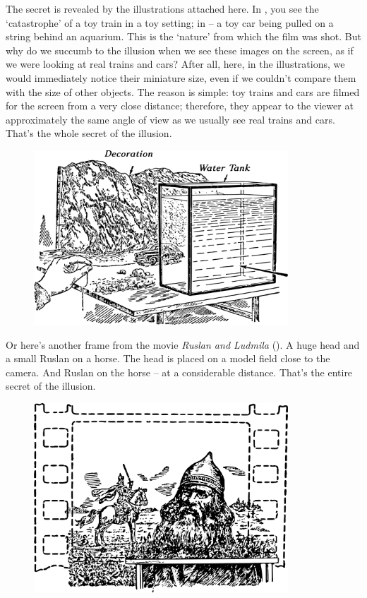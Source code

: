 The secret is revealed by the illustrations attached here. In , you see the `catastrophe' of a toy train in a toy setting; in  -- a toy car being pulled on a string behind an aquarium. This is the `nature' from which the film was shot. But why do we succumb to the illusion when we see these images on the screen, as if we were looking at real trains and cars? After all, here, in the illustrations, we would immediately notice their miniature size, even if we couldn't compare them with the size of other objects. The reason is simple: toy trains and cars are filmed for the screen from a very close distance; therefore, they appear to the viewer at approximately the same angle of view as we usually see real trains and cars. That's the whole secret of the illusion.

\begin{figure}[h!]
\centering
\includegraphics[width=0.85\textwidth]{figures/ch-03/fig-064.pdf}
\end{figure}

Or here's another frame from the movie \emph{Ruslan and Ludmila} (). A huge head and a small Ruslan on a horse. The head is placed on a model field close to the camera. And Ruslan on the horse -- at a considerable distance. That's the entire secret of the illusion.

\begin{figure}[h!]
\centering
\includegraphics[width=0.85\textwidth]{figures/ch-03/fig-065.pdf}
\end{figure}

